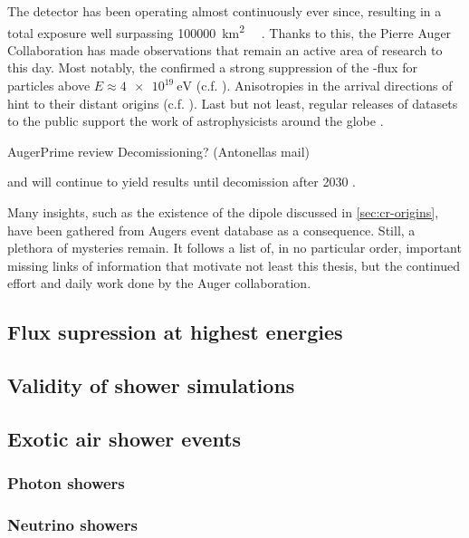The detector has been operating almost continuously ever since, resulting in a 
total exposure well surpassing \SI{100000}{\km\squared\sr\year} 
\cite{aabPierreAugerObservatory2020}. Thanks to this, the Pierre Auger 
Collaboration has made observations that remain an active area of research to 
this day. Most notably, the \PAO confirmed a strong suppression of the \CR-flux 
for particles above $E\approx\SI{4e19}{\eV}$ 
\cite{yamamotoUHECRSpectrumMeasured2007} (c.f. ).
Anisotropies in the arrival directions of \UHECRs hint to their distant origins
\cite{thepierreaugercollaborationObservationLargescaleAnisotropy2017} (c.f. 
). Last but not least, regular releases of datasets to
the public support the work of astrophysicists around the globe
\cite{pierreaugercollaborationPierreAugerObservatory2025}.


AugerPrime review
Decomissioning? (Antonellas mail)


\cite{abraham_properties_2004} and will continue to yield results until 
decomission after 2030 \cite{castellina_outcome_2023}.

Many insights, such as the existence of the \CR dipole discussed in
\cref{sec:cr-origins}, have been gathered from Augers event database as a 
consequence. Still, a plethora of mysteries remain. It follows a list of, in no 
particular order, important missing links of information that motivate not least
this thesis, but the continued effort and daily work done by the Auger 
collaboration.

\subsection{Flux supression at highest energies}
\label{ssec:flux-supression}

\subsection{Validity of shower simulations}


\subsection{Exotic air shower events}
\subsubsection{Photon showers}
\subsubsection{Neutrino showers}
